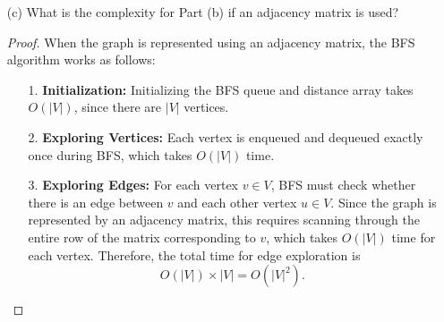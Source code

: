 \documentclass[12pt]{article}
\begin{document}
\begin{itemize}
\begin{proof}
\begin{itemize}
    \item[2.]  \textbf{Exploring Vertices:} Each vertex is enqueued and dequeued exactly once during the BFS traversal. Since there are $|V|$ vertices, this step takes $O(|V|)$ time.

    \item[3.]  \textbf{Exploring Edges:} For each vertex $v \in V$, BFS iterates over all of its neighbors, i.e., all vertices adjacent to $v$. The time to explore the neighbors of a vertex $v$ is proportional to the degree of $v$, denoted $\deg(v)$. Therefore, the total time to explore all neighbors of all vertices is
    \[
    O\left( \sum_{v \in V} \deg(v) \right).
    \]
    By the result from Part (a), we know that
    \[
    \sum_{v \in V} \deg(v) = 2|E|.
    \]
    Thus, the time spent exploring edges is $O(2|E|) = O(|E|)$.

    \item[4.] \textbf{Total Time Complexity:} The total time is the sum of the time spent on initialization, vertex exploration, and edge exploration. Hence, the overall time complexity of BFS is
    \[
    O(|V| + |E|).
    \]
\end{itemize}
\end{proof}


\item[(c)] What is the complexity for Part (b) if an adjacency matrix is used?

\begin{proof}
When the graph is represented using an adjacency matrix, the BFS algorithm works as follows:
\begin{itemize}
    \item[1.] \textbf{Initialization:}  Initializing the BFS queue and distance array takes $O(|V|)$, since there are $|V|$ vertices.
    
    \item[2.] \textbf{Exploring Vertices:}  Each vertex is enqueued and dequeued exactly once during BFS, which takes $O(|V|)$ time.
    
    \item[3.] \textbf{Exploring Edges:}  For each vertex $v \in V$, BFS must check whether there is an edge between $v$ and each other vertex $u \in V$. Since the graph is represented by an adjacency matrix, this requires scanning through the entire row of the matrix corresponding to $v$, which takes $O(|V|)$ time for each vertex. Therefore, the total time for edge exploration is
    \[
    O(|V|) \times |V| = O(|V|^2).
    \]
    

\end{itemize}
\end{proof}
\end{itemize}
\end{document}
